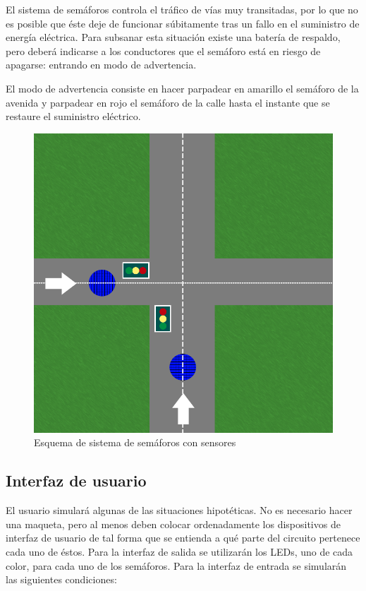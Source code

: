 El sistema de semáforos controla el tráfico de vías muy transitadas, por lo que no es posible que éste deje de funcionar súbitamente tras un fallo en el suministro de energía eléctrica.
Para subsanar esta situación existe una batería de respaldo, pero deberá indicarse a los conductores que el semáforo está en riesgo de apagarse: entrando en modo de advertencia.

El modo de advertencia consiste en hacer parpadear en amarillo el semáforo de la avenida y parpadear en rojo el semáforo de la calle hasta el instante que se restaure el 
suministro eléctrico.

\begin{figure}[H]
    \centering
    \includegraphics[scale=0.4]{images/Semaforos.png}
    \caption{Esquema de sistema de semáforos con sensores}
    \label{Fig:Semaforos}
\end{figure}

\subsection{Interfaz de usuario}
El usuario simulará algunas de las situaciones hipotéticas. No es necesario hacer una maqueta, pero al menos deben colocar ordenadamente los dispositivos de interfaz de usuario de tal forma
que se entienda a qué parte del circuito pertenece cada uno de éstos. Para la interfaz de salida se utilizarán los LEDs, uno de cada color, para cada uno de los semáforos. Para la 
interfaz de entrada se simularán las siguientes condiciones:

